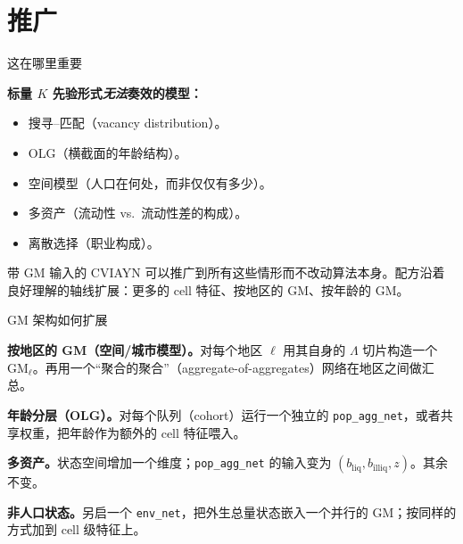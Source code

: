 \documentclass[10pt,aspectratio=169]{beamer}
\begin{document}
\section[推广]{推广}

\begin{frame}{这在哪里重要}

\textbf{标量 $K$ 先验形式\emph{无法}奏效的模型：}

\begin{itemize}
  \item 搜寻--匹配（vacancy distribution）。
  \item OLG（横截面的年龄结构）。
  \item 空间模型（人口在何处，而非仅仅有多少）。
  \item 多资产（流动性 vs.\ 流动性差的构成）。
  \item 离散选择（职业构成）。
\end{itemize}

\smallskip

带 GM 输入的 CVIAYN 可以推广到所有这些情形而不改动算法本身。配方沿着良好理解的轴线扩展：更多的 cell 特征、按地区的 GM、按年龄的 GM。

\end{frame}

\begin{frame}{GM 架构如何扩展}

\textbf{按地区的 GM（空间/城市模型）。}对每个地区 $\ell$ 用其自身的 $\Lambda$ 切片构造一个 $\mathrm{GM}_\ell$。再用一个“聚合的聚合”（aggregate-of-aggregates）网络在地区之间做汇总。

\smallskip

\textbf{年龄分层（OLG）。}对每个队列（cohort）运行一个独立的 \texttt{pop\_agg\_net}，或者共享权重，把年龄作为额外的 cell 特征喂入。

\smallskip

\textbf{多资产。}状态空间增加一个维度；\texttt{pop\_agg\_net} 的输入变为 $(b_{\mathrm{liq}}, b_{\mathrm{illiq}}, z)$。其余不变。

\smallskip

\textbf{非人口状态。}另启一个 \texttt{env\_net}，把外生总量状态嵌入一个并行的 GM；按同样的方式加到 cell 级特征上。

\end{frame}
\end{document}
